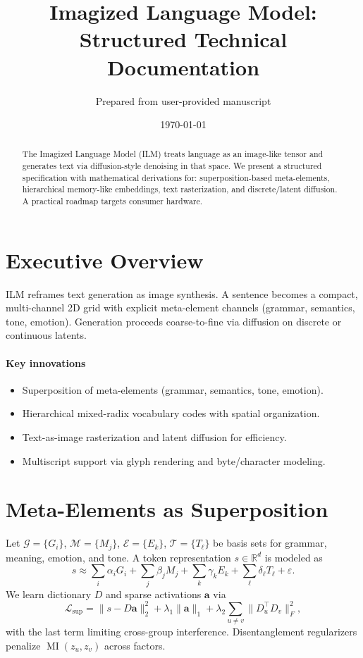 \documentclass[11pt]{article}
\title{Imagized Language Model: Structured Technical Documentation}
\author{Prepared from user-provided manuscript}
\date{\today}
\begin{document}
\maketitle

\begin{abstract}
The Imagized Language Model (ILM) treats language as an image-like tensor and generates text via diffusion-style denoising in that space. We present a structured specification with mathematical derivations for: superposition-based meta-elements, hierarchical memory-like embeddings, text rasterization, and discrete/latent diffusion. A practical roadmap targets consumer hardware.
\end{abstract}

\tableofcontents

\section{Executive Overview}
ILM reframes text generation as image synthesis. A sentence becomes a compact, multi-channel 2D grid with explicit meta-element channels (grammar, semantics, tone, emotion). Generation proceeds coarse-to-fine via diffusion on discrete or continuous latents.

\paragraph{Key innovations}
\begin{itemize}[noitemsep,topsep=2pt]
  \item Superposition of meta-elements (grammar, semantics, tone, emotion).
  \item Hierarchical mixed-radix vocabulary codes with spatial organization.
  \item Text-as-image rasterization and latent diffusion for efficiency.
  \item Multiscript support via glyph rendering and byte/character modeling.
\end{itemize}

\section{Meta-Elements as Superposition}
Let $\mathcal{G}{=}\{G_i\}$, $\mathcal{M}{=}\{M_j\}$, $\mathcal{E}{=}\{E_k\}$, $\mathcal{T}{=}\{T_\ell\}$ be basis sets for grammar, meaning, emotion, and tone. A token representation $s\in\mathbb{R}^d$ is modeled as
\begin{equation}
  s \approx \sum_{i} \alpha_i G_i + \sum_{j} \beta_j M_j + \sum_{k} \gamma_k E_k + \sum_{\ell} \delta_\ell T_\ell + \varepsilon.
\end{equation}
We learn dictionary $D$ and sparse activations $\bm{a}$ via
\begin{equation}
\mathcal{L}_{\text{sup}}=\| s - D\bm{a} \|_2^2 + \lambda_1\|\bm{a}\|_1 + \lambda_2\sum_{u\ne v}\|D_u^\top D_v\|_F^2,
\end{equation}
with the last term limiting cross-group interference. Disentanglement regularizers penalize $\operatorname{MI}(z_u,z_v)$ across factors.
\end{document}
